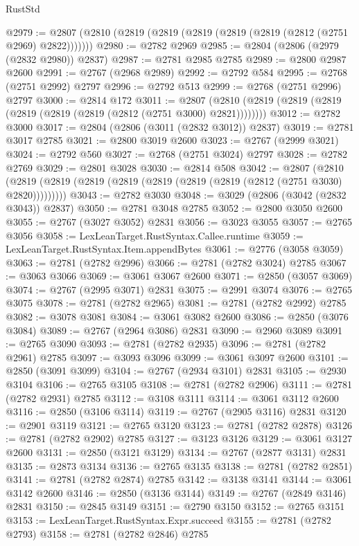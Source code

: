 \begin{lexlean}{RustStd}
\begin{coremodule}
@2979 := @2807 (@2810 (@2819 (@2819 (@2819 (@2819 (@2819 (@2812 (@2751 @2969) @2822)))))))
@2980 := @2782 @2969
@2985 := @2804 (@2806 (@2979 (@2832 @2980)) @2837)
@2987 := @2781 @2985 @2785
@2989 := @2800 @2987 @2600
@2991 := @2767 (@2968 @2989)
@2992 := @2792 @584
@2995 := @2768 (@2751 @2992) @2797
@2996 := @2792 @513
@2999 := @2768 (@2751 @2996) @2797
@3000 := @2814 @172
@3011 := @2807 (@2810 (@2819 (@2819 (@2819 (@2819 (@2819 (@2819 (@2812 (@2751 @3000) @2821))))))))
@3012 := @2782 @3000
@3017 := @2804 (@2806 (@3011 (@2832 @3012)) @2837)
@3019 := @2781 @3017 @2785
@3021 := @2800 @3019 @2600
@3023 := @2767 (@2999 @3021)
@3024 := @2792 @560
@3027 := @2768 (@2751 @3024) @2797
@3028 := @2782 @2769
@3029 := @2801 @3028
@3030 := @2814 @508
@3042 := @2807
    (@2810 (@2819 (@2819 (@2819 (@2819 (@2819 (@2819 (@2819 (@2812 (@2751 @3030) @2820)))))))))
@3043 := @2782 @3030
@3048 := @3029 (@2806 (@3042 (@2832 @3043)) @2837)
@3050 := @2781 @3048 @2785
@3052 := @2800 @3050 @2600
@3055 := @2767 (@3027 @3052) @2831
@3056 := @3023 @3055
@3057 := @2765 @3056
@3058 := LexLeanTarget.RustSyntax.Callee.runtime
@3059 := LexLeanTarget.RustSyntax.Item.appendBytes
@3061 := @2776 (@3058 @3059)
@3063 := @2781 (@2782 @2996)
@3066 := @2781 (@2782 @3024) @2785
@3067 := @3063 @3066
@3069 := @3061 @3067 @2600
@3071 := @2850 (@3057 @3069)
@3074 := @2767 (@2995 @3071) @2831
@3075 := @2991 @3074
@3076 := @2765 @3075
@3078 := @2781 (@2782 @2965)
@3081 := @2781 (@2782 @2992) @2785
@3082 := @3078 @3081
@3084 := @3061 @3082 @2600
@3086 := @2850 (@3076 @3084)
@3089 := @2767 (@2964 @3086) @2831
@3090 := @2960 @3089
@3091 := @2765 @3090
@3093 := @2781 (@2782 @2935)
@3096 := @2781 (@2782 @2961) @2785
@3097 := @3093 @3096
@3099 := @3061 @3097 @2600
@3101 := @2850 (@3091 @3099)
@3104 := @2767 (@2934 @3101) @2831
@3105 := @2930 @3104
@3106 := @2765 @3105
@3108 := @2781 (@2782 @2906)
@3111 := @2781 (@2782 @2931) @2785
@3112 := @3108 @3111
@3114 := @3061 @3112 @2600
@3116 := @2850 (@3106 @3114)
@3119 := @2767 (@2905 @3116) @2831
@3120 := @2901 @3119
@3121 := @2765 @3120
@3123 := @2781 (@2782 @2878)
@3126 := @2781 (@2782 @2902) @2785
@3127 := @3123 @3126
@3129 := @3061 @3127 @2600
@3131 := @2850 (@3121 @3129)
@3134 := @2767 (@2877 @3131) @2831
@3135 := @2873 @3134
@3136 := @2765 @3135
@3138 := @2781 (@2782 @2851)
@3141 := @2781 (@2782 @2874) @2785
@3142 := @3138 @3141
@3144 := @3061 @3142 @2600
@3146 := @2850 (@3136 @3144)
@3149 := @2767 (@2849 @3146) @2831
@3150 := @2845 @3149
@3151 := @2790 @3150
@3152 := @2765 @3151
@3153 := LexLeanTarget.RustSyntax.Expr.succeed
@3155 := @2781 (@2782 @2793)
@3158 := @2781 (@2782 @2846) @2785

\end{coremodule}
\end{lexlean}
